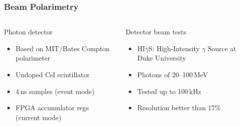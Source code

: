 \begin{frame}[t]
 \frametitle{Beam Polarimetry}
 \begin{columns}[T]
   \begin{block}{Photon detector}
    \begin{itemize}
     \item Based on MIT/Bates Compton polarimeter
     \item \alert{Undoped CsI scintillator}
     \item 4\,ns samples (event mode)
     \item FPGA accumulator regs (current mode)
    \end{itemize}
    \begin{center}
    \end{center}
   \end{block}
   \begin{block}{Detector beam tests}
    \begin{itemize}
     \item HI$\gamma$S: High-Intensity $\gamma$ Source at Duke University
     \item Photons of 20--100\,MeV
     \item Tested \alert{up to 100\,kHz}
     \item \alert{Resolution better than 17\%}
    \end{itemize}
    \begin{center}
    \end{center}
   \end{block}
 \end{columns}
\end{frame}

